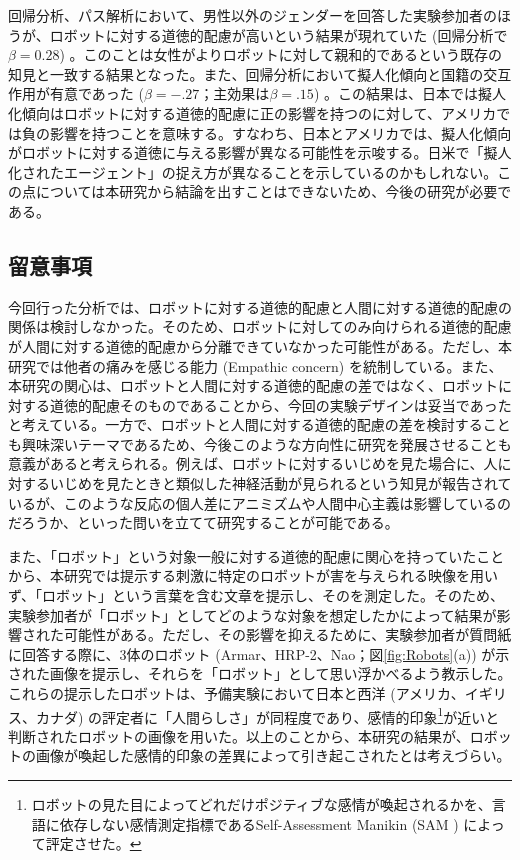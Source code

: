 \documentclass[a4j,12pt]{jreport}
\begin{document}
回帰分析、パス解析において、男性以外のジェンダーを回答した実験参加者のほうが、ロボットに対する道徳的配慮が高いという結果が現れていた (回帰分析で$\beta=0.28$) 。このことは女性がよりロボットに対して親和的であるという既存の知見\cite{gend, gend2}と一致する結果となった。また、回帰分析において擬人化傾向と国籍の交互作用が有意であった ($\beta=-.27$；主効果は$\beta=.15$) 。この結果は、日本では擬人化傾向はロボットに対する道徳的配慮に正の影響を持つのに対して、アメリカでは負の影響を持つことを意味する。すなわち、日本とアメリカでは、擬人化傾向がロボットに対する道徳に与える影響が異なる可能性を示唆する。日米で「擬人化されたエージェント」の捉え方が異なることを示しているのかもしれない。この点については本研究から結論を出すことはできないため、今後の研究が必要である。

\subsection{留意事項}
今回行った分析では、ロボットに対する道徳的配慮と人間に対する道徳的配慮の関係は検討しなかった。そのため、ロボットに対してのみ向けられる道徳的配慮が人間に対する道徳的配慮から分離できていなかった可能性がある。ただし、本研究では他者の痛みを感じる能力 (Empathic concern) を統制している。また、本研究の関心は、ロボットと人間に対する道徳的配慮の差ではなく、ロボットに対する道徳的配慮そのものであることから、今回の実験デザインは妥当であったと考えている。一方で、ロボットと人間に対する道徳的配慮の差を検討することも興味深いテーマであるため、今後このような方向性に研究を発展させることも意義があると考えられる。例えば、ロボットに対するいじめを見た場合に、人に対するいじめを見たときと類似した神経活動が見られるという知見\cite{fmri}が報告されているが、このような反応の個人差にアニミズムや人間中心主義は影響しているのだろうか、といった問いを立てて研究することが可能である。



また、「ロボット」という対象一般に対する道徳的配慮に関心を持っていたことから、本研究では提示する刺激に特定のロボットが害を与えられる映像を用いず、「ロボット」という言葉を含む文章を提示し、そのを測定した。そのため、実験参加者が「ロボット」としてどのような対象を想定したかによって結果が影響された可能性がある。ただし、その影響を抑えるために、実験参加者が質問紙に回答する際に、3体のロボット (Armar、HRP-2、Nao；図\ref{fig:Robots}(a)) が示された画像を提示し、それらを「ロボット」として思い浮かべるよう教示した。これらの提示したロボットは、予備実験において日本と西洋 (アメリカ、イギリス、カナダ) の評定者に「人間らしさ」が同程度であり、感情的印象\footnote{ロボットの見た目によってどれだけポジティブな感情が喚起されるかを、言語に依存しない感情測定指標であるSelf-Assessment Manikin (SAM \cite{sam}) によって評定させた。}が近いと判断されたロボットの画像\cite{ikari}を用いた。以上のことから、本研究の結果が、ロボットの画像が喚起した感情的印象の差異によって引き起こされたとは考えづらい。
\end{document}
